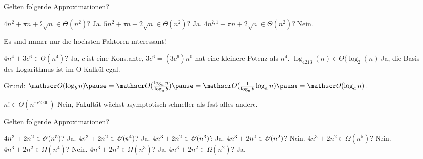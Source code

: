 \begin{frame}
	Gelten folgende Approximationen?
	
	\begin{itemize}
		\pitem $4n^2 + \pi n + 2 \sqrt{n} \in \Theta(n^2)?$ \pause Ja.
		\pitem $5n^2 + \pi n + 2 \sqrt{n} \in \Theta(n^2)?$ \pause Ja.
		\pitem $4n^{2,1} + \pi n + 2 \sqrt{n} \in \Theta(n^2)?$ \pause Nein.
	\end{itemize}

	\bp Es sind immer nur die höchsten Faktoren interessant!
	
	\begin{itemize}
		\pitem $4n^4 + 3c^6 \in \Theta(n^4)$? \pause Ja\ip, $c$ ist eine Konstante, $3c^6=(3c^6)n^0$ hat eine kleinere Potenz als $n^4$.
		\pitem $\log_{4213}(n) \in \Theta(\log_2(n)$ \pause Ja\ip, die Basis des Logarithmus ist im O-Kalkül egal.
		
		\begin{itemize}
			\pitem Grund: $\okalk(\log_b n) \ip= \okalk(\frac{\log_a n}{\log_a b}) \ip = \okalk(\frac{1}{\log_a b}\log_a n) \ip = \okalk(\log_a n)$.
		\end{itemize}
		
		\pitem $n! \in \Theta(n^{\pi e 2000})$ \pause Nein\ip, Fakultät wächst asymptotisch schneller als fast alles andere.
	\end{itemize}
\end{frame}

\begin{frame}
	Gelten folgende Approximationen?
	
	\begin{itemize}
		\pitem $4n^3 + 2n^2 \in \mathscr{O}(n^5)$? \pause Ja.
		\pitem $4n^3 + 2n^2 \in \mathscr{O}(n^4)$? \pause Ja.
		\pitem $4n^3 + 2n^2 \in \mathscr{O}(n^3)$? \pause Ja.
		\pitem $4n^3 + 2n^2 \in \mathscr{O}(n^2)$? \pause Nein.
		\pitem $4n^3 + 2n^2 \in \Omega(n^5)$? \pause Nein.
		\pitem $4n^3 + 2n^2 \in \Omega(n^4)$? \pause Nein.
		\pitem $4n^3 + 2n^2 \in \Omega(n^3)$? \pause Ja.
		\pitem $4n^3 + 2n^2 \in \Omega(n^2)$? \pause Ja.
	\end{itemize}
\end{frame}

